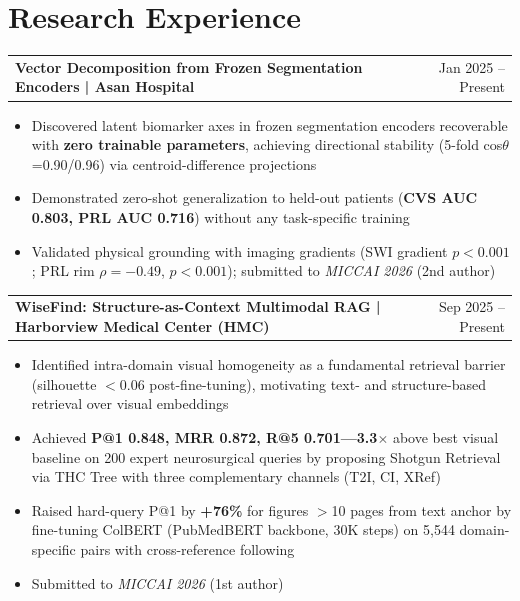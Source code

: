 \documentclass[a4paper,10pt]{article}
\makeatletter
\newenvironment{joblong}[2]
    {
    \begin{tabularx}{\linewidth}{@{}l X r@{}}
    \textbf{#1} & \hfill &  #2 \\[3.75pt]
    \end{tabularx}
    \begin{minipage}[t]{\linewidth}
    \begin{itemize}[nosep,after=\strut, leftmargin=1em, itemsep=3pt,label=--]
    }
    {
    \end{itemize}
    \end{minipage}    
    }
\makeatother
\begin{document}
\vspace{-7pt}
\section{Research Experience}

\begin{joblong}{Vector Decomposition from Frozen Segmentation Encoders | Asan Hospital }{Jan 2025 -- Present}
\item Discovered latent biomarker axes in frozen segmentation encoders recoverable with \textbf{zero trainable parameters}, achieving directional stability (5-fold cos$\theta$=0.90/0.96) via centroid-difference projections
\item Demonstrated zero-shot generalization to held-out patients (\textbf{CVS AUC 0.803, PRL AUC 0.716}) without any task-specific training
\item Validated physical grounding with imaging gradients (SWI gradient $p<0.001$; PRL rim $\rho=-0.49$, $p<0.001$); submitted to \textit{MICCAI 2026} (2nd author)
\end{joblong}

\vspace{-5pt}

\begin{joblong}{WiseFind: Structure-as-Context Multimodal RAG | Harborview Medical Center (HMC)}{Sep 2025 -- Present}
\item Identified intra-domain visual homogeneity as a fundamental retrieval barrier (silhouette $<$0.06 post-fine-tuning), motivating text- and structure-based retrieval over visual embeddings
\item Achieved \textbf{P@1 0.848, MRR 0.872, R@5 0.701}\textbf{---3.3$\times$} above best visual baseline on 200 expert neurosurgical queries by proposing Shotgun Retrieval via THC Tree with three complementary channels (T2I, CI, XRef)
\item Raised hard-query P@1 by \textbf{+76\%} for figures $>$10 pages from text anchor by fine-tuning ColBERT (PubMedBERT backbone, 30K steps) on 5,544 domain-specific pairs with cross-reference following
\item Submitted to \textit{MICCAI 2026} (1st author)
\end{joblong}

\vspace{-5pt}
\end{document}
